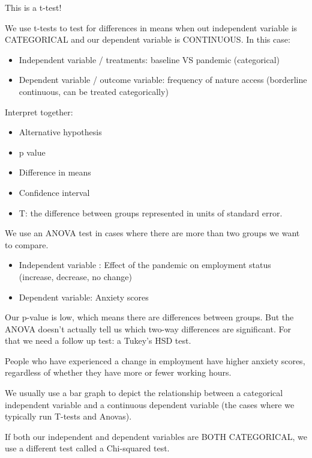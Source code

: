 \documentclass[
]{book}
\providecommand{\tightlist}{%
  \setlength{\itemsep}{0pt}\setlength{\parskip}{0pt}}
\begin{document}
This is a t-test!

We use t-tests to test for differences in means when out independent variable is CATEGORICAL and our dependent variable is CONTINUOUS. In this case:

\begin{itemize}
\tightlist
\item
  Independent variable / treatments: baseline VS pandemic (categorical)
\item
  Dependent variable / outcome variable: frequency of nature access (borderline continuous, can be treated categorically)
\end{itemize}

Interpret together:

\begin{itemize}
\tightlist
\item
  Alternative hypothesis
\item
  p value
\item
  Difference in means
\item
  Confidence interval
\item
  T: the difference between groups represented in units of standard error.
\end{itemize}

We use an ANOVA test in cases where there are more than two groups we want to compare.

\begin{itemize}
\tightlist
\item
  Independent variable : Effect of the pandemic on employment status (increase, decrease, no change)
\item
  Dependent variable: Anxiety scores
\end{itemize}

Our p-value is low, which means there are differences between groups. But the ANOVA doesn't actually tell us which two-way differences are significant. For that we need a follow up test: a Tukey's HSD test.

People who have experienced a change in employment have higher anxiety scores, regardless of whether they have more or fewer working hours.

We usually use a bar graph to depict the relationship between a categorical independent variable and a continuous dependent variable (the cases where we typically run T-tests and Anovas).

If both our independent and dependent variables are BOTH CATEGORICAL, we use a different test called a Chi-squared test.
\end{document}
